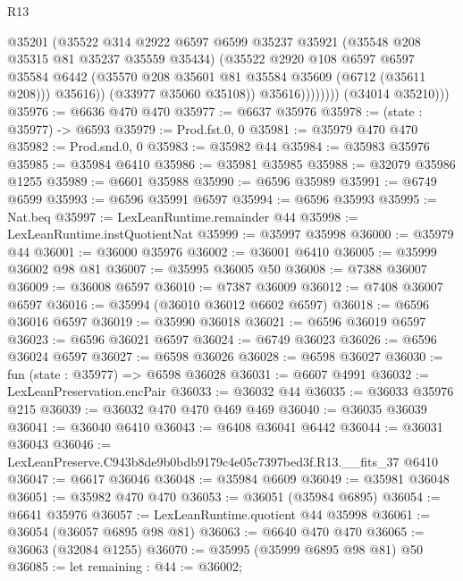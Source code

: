 \begin{lexlean}{R13}
\begin{coremodule}
                          @35201
                          (@35522
                            @314
                            @2922
                            @6597
                            @6599
                            @35237
                            @35921
                            (@35548 @208 @35315 @81 @35237 @35559 @35434)
                            (@35522
                              @2920
                              @108
                              @6597
                              @6597
                              @35584
                              @6442
                              (@35570 @208 @35601 @81 @35584 @35609 (@6712 (@35611 @208)))
                              @35616))
                          (@33977 @35060 @35108))
                        @35616))))))))
        (@34014 @35210)))
@35976 := @6636 @470 @470
@35977 := @6637 @35976
@35978 := (state : @35977) -> @6593
@35979 := Prod.fst.{0, 0}
@35981 := @35979 @470 @470
@35982 := Prod.snd.{0, 0}
@35983 := @35982 @44
@35984 := @35983 @35976
@35985 := @35984 @6410
@35986 := @35981 @35985
@35988 := @32079 @35986 @1255
@35989 := @6601 @35988
@35990 := @6596 @35989
@35991 := @6749 @6599
@35993 := @6596 @35991 @6597
@35994 := @6596 @35993
@35995 := Nat.beq
@35997 := LexLeanRuntime.remainder @44
@35998 := LexLeanRuntime.instQuotientNat
@35999 := @35997 @35998
@36000 := @35979 @44
@36001 := @36000 @35976
@36002 := @36001 @6410
@36005 := @35999 @36002 @98 @81
@36007 := @35995 @36005 @50
@36008 := @7388 @36007
@36009 := @36008 @6597
@36010 := @7387 @36009
@36012 := @7408 @36007 @6597
@36016 := @35994 (@36010 @36012 @6602 @6597)
@36018 := @6596 @36016 @6597
@36019 := @35990 @36018
@36021 := @6596 @36019 @6597
@36023 := @6596 @36021 @6597
@36024 := @6749 @36023
@36026 := @6596 @36024 @6597
@36027 := @6598 @36026
@36028 := @6598 @36027
@36030 := fun (state : @35977) => @6598 @36028
@36031 := @6607 @4991
@36032 := LexLeanPreservation.encPair
@36033 := @36032 @44
@36035 := @36033 @35976 @215
@36039 := @36032 @470 @470 @469 @469
@36040 := @36035 @36039
@36041 := @36040 @6410
@36043 := @6408 @36041 @6442
@36044 := @36031 @36043
@36046 := LexLeanPreserve.C943b8de9b0bdb9179c4e05c7397bed3f.R13.__fits_37 @6410
@36047 := @6617 @36046
@36048 := @35984 @6609
@36049 := @35981 @36048
@36051 := @35982 @470 @470
@36053 := @36051 (@35984 @6895)
@36054 := @6641 @35976
@36057 := LexLeanRuntime.quotient @44 @35998
@36061 := @36054 (@36057 @6895 @98 @81)
@36063 := @6640 @470 @470
@36065 := @36063 (@32084 @1255)
@36070 := @35995 (@35999 @6895 @98 @81) @50
@36085 := let remaining : @44 := @36002;

\end{coremodule}
\end{lexlean}
